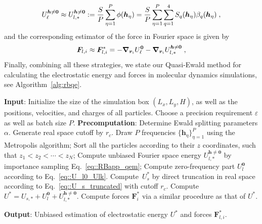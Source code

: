 \begin{equation}\label{eq::RBapp_qem}
 U_\ell^{\boldsymbol{h}\neq \bm{0}} \approx U_{l,\ast}^{\boldsymbol{h}\neq \bm{0}}  :=   \frac{S}{P}\sum_{\eta=1}^P \phi(\boldsymbol{h}_{\eta})=  \frac{S}{P}\sum_{\eta=1}^P \sum_{q=1}^4S_q(\boldsymbol{h}_{\eta})\beta_q(\boldsymbol{h}_{\eta})\;,
\end{equation} 
and the corresponding estimator of the force in Fourier space is given by
\begin{equation}
	 \bm{F}_{l,i}\approx\bm{F}_{l,i}^*=-  \boldsymbol{\nabla}_{\boldsymbol{r}_i} U_\ell^{\bm{0}}- \boldsymbol{\nabla}_{\boldsymbol{r}_i} U_{l,\ast}^{\boldsymbol{h}\neq \bm{0}}\;,
 \end{equation}
Finally, combining all these strategies, we state our Quasi-Ewald method for calculating the electrostatic energy and forces in molecular dynamics simulations, see Algorithm~\ref{alg:rbqe}.
\begin{algorithm}[ht] 
\caption{The Quasi-Ewald method}
\begin{algorithmic}[1]
    \State \textbf{Input}:  Initialize the size of the simulation box $(L_x,L_y, H)$, as well as the positions, velocities, and charges of all particles. Choose a precision requirement $\varepsilon$ as well as batch size $P$.
    \State \textbf{Precomputation}:  Determine Ewald splitting parameters $\alpha$. Generate real space cutoff by $r_c$.
    \Procedure{}       
        \State Draw $P$ frequencies $\{\bm{h}_{\eta}\}_{\eta=1}^{P}$ using the Metropolis algorithm;
        \State Sort all the particles according to their $z$ coordinates, such that $z_1 < z_2 < \cdots < z_N$;
        \State Compute unbiased Fourier space energy $U_{l, *}^{\bm{h}\neq\bm{0}}$ by importance sampling Eq.~\eqref{eq::RBapp_qem};
        \State Compute zero-frequency part $U_{l}^{\bm{0}}$ according to Eq.~\eqref{eq::U_l0_Ulk}.
        \State Compute~$U_{s}^{*}$ by direct truncation in real space according to Eq.~\eqref{eq::U_s_truncated} with cutoff $r_c$. %
        \State Compute $U^{*} = U_{s, *} + U_{l}^{\bm{0}} + U_{l, *}^{\bm{h}\neq\bm{0}}$.
        \State Compute forces $\bm{F}_{i}^{*}$ via a similar procedure as that of $U^{*}$.
    \EndProcedure

    \State \textbf{Output}: Unbiased estimation of electrostatic energy $U^{*}$ and forces $\bm{F}_{l,i}^{*}$.
\end{algorithmic}\label{alg:rbqe}
\end{algorithm}
